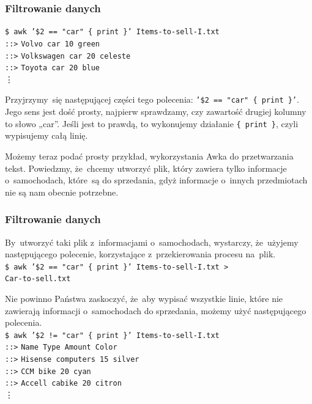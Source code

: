 \documentclass[10pt,t]{beamer}
\begin{document}
\begin{frame}
  \frametitle{Filtrowanie danych}


  \texttt{\$ awk '\$2 == "car" \hspace{0.25em} \{ print \}'
    Items-to-sell-I.txt} \\
  \texttt{::>} \texttt{Volvo car 10 green} \\
  \texttt{::>} \texttt{Volkswagen car 20 celeste} \\
  \texttt{::>} \texttt{Toyota car 20 blue} \\
  \hspace{3em} \vdots

  Przyjrzymy~się następującej części tego polecenia:
  \texttt{'\$2 == "car" \hspace{0.25em} \{ print \}'}. Jego sens jest dość
  prosty, najpierw sprawdzamy, czy zawartość drugiej kolumny to słowo
  „car”. Jeśli jest to prawdą, to wykonujemy działanie \texttt{\{ print \}},
  czyli wypisujemy całą linię.

  Możemy teraz podać prosty przykład, wykorzystania Awka do przetwarzania
  tekst. Powiedzmy, że~chcemy utworzyć plik, który zawiera tylko informacje
  o~samochodach, które~są do sprzedania, gdyż informacje o~innych
  przedmiotach nie są nam obecnie potrzebne.

\end{frame}





\begin{frame}
  \frametitle{Filtrowanie danych}


  By~utworzyć taki plik z~informacjami o~samochodach, wystarczy, że~użyjemy
  następującego polecenie, korzystające z~przekierowania procesu
  na~plik. \\
  \texttt{\$ awk '\$2 == "car" \hspace{0.25em} \{ print \}'
    Items-to-sell-I.txt > } \\
  \texttt{Car-to-sell.txt}

  Nie powinno Państwa zaskoczyć, że~aby wypisać wszystkie linie, które
  \alert{nie} zawierają informacji o~samochodach do sprzedania, możemy
  użyć następującego polecenia. \\
  \texttt{\$ awk '\$2 != "car" \hspace{0.25em} \{ print \}'
    Items-to-sell-I.txt} \\
  \texttt{::>} \texttt{Name Type Amount Color} \\
  \texttt{::>} \texttt{Hisense computers 15 silver} \\
  \texttt{::>} \texttt{CCM bike 20 cyan} \\
  \texttt{::>} \texttt{Accell cabike 20 citron} \\
  \hspace{3em} \vdots

\end{frame}
\end{document}
